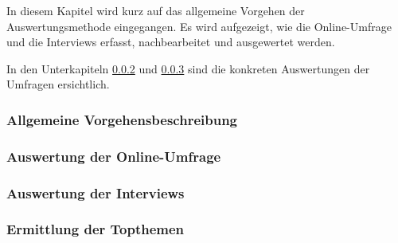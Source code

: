 \documentclass[../../main.tex]{subfiles}
\begin{document}
\begin{sloppypar}
In diesem Kapitel wird kurz auf das allgemeine Vorgehen der Auswertungsmethode eingegangen. Es wird aufgezeigt, wie die Online-Umfrage und die Interviews erfasst, nachbearbeitet und ausgewertet werden.

In den Unterkapiteln \ref{auswertung_online} und  \ref{auswertung_interview} sind die konkreten Auswertungen der Umfragen ersichtlich.

\end{sloppypar}

\subsubsection{Allgemeine Vorgehensbeschreibung}



\subsubsection{Auswertung der Online-Umfrage}
\label{auswertung_online}



\subsubsection{Auswertung der Interviews}
\label{auswertung_interview}



\subsubsection{Ermittlung der Topthemen}

\end{document}
